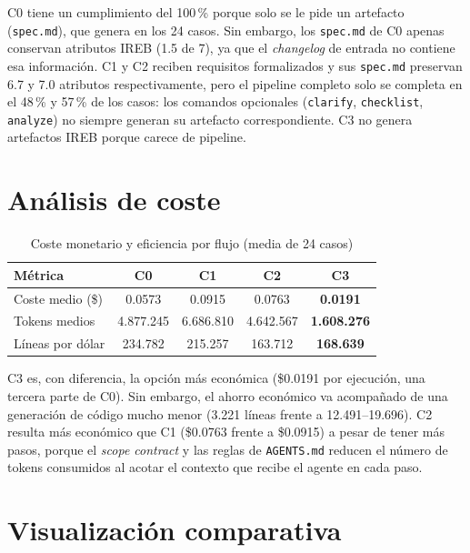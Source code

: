 C0 tiene un cumplimiento del 100\,\% porque solo se le pide un artefacto (\texttt{spec.md}), que genera en los 24 casos. Sin embargo, los \texttt{spec.md} de C0 apenas conservan atributos IREB (1.5 de 7), ya que el \emph{changelog} de entrada no contiene esa informaci\'on. C1 y C2 reciben requisitos formalizados y sus \texttt{spec.md} preservan 6.7 y 7.0 atributos respectivamente, pero el pipeline completo solo se completa en el 48\,\% y 57\,\% de los casos: los comandos opcionales (\texttt{clarify}, \texttt{checklist}, \texttt{analyze}) no siempre generan su artefacto correspondiente. C3 no genera artefactos IREB porque carece de pipeline.

\FloatBarrier
\section{An\'alisis de coste}

\begin{table}[htbp]
\centering
\caption{Coste monetario y eficiencia por flujo (media de 24 casos)}
\label{tab:coste-real}
\begin{tabular}{lcccc}
\toprule
\textbf{M\'etrica} & \textbf{C0} & \textbf{C1} & \textbf{C2} & \textbf{C3} \\
\midrule
Coste medio (\$) & 0.0573 & 0.0915 & 0.0763 & \textbf{0.0191} \\
Tokens medios & 4.877.245 & 6.686.810 & 4.642.567 & \textbf{1.608.276} \\
L\'ineas por d\'olar & 234.782 & 215.257 & 163.712 & \textbf{168.639} \\
\midrule
\end{tabular}
\end{table}

C3 es, con diferencia, la opci\'on m\'as econ\'omica (\$0.0191 por ejecuci\'on, una tercera parte de C0). Sin embargo, el ahorro econ\'omico va acompa\~nado de una generaci\'on de c\'odigo mucho menor (3.221 l\'ineas frente a 12.491--19.696). C2 resulta m\'as econ\'omico que C1 (\$0.0763 frente a \$0.0915) a pesar de tener m\'as pasos, porque el \emph{scope contract} y las reglas de \texttt{AGENTS.md} reducen el n\'umero de tokens consumidos al acotar el contexto que recibe el agente en cada paso.

\section{Visualizaci\'on comparativa}

